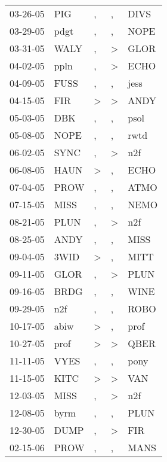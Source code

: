\begin{supertabular}{lllll}
 03-26-05 &   PIG &             , &             , &  DIVS \\
 03-29-05 &  pdgt &             , &             , &  NOPE \\
 03-31-05 &  WALY &             , &  \textgreater &  GLOR \\
 04-02-05 &  ppln &             , &  \textgreater &  ECHO \\
 04-09-05 &  FUSS &             , &             , &  jess \\
 04-15-05 &   FIR &  \textgreater &  \textgreater &  ANDY \\
 05-03-05 &   DBK &             , &             , &  psol \\
 05-08-05 &  NOPE &             , &             , &  rwtd \\
 06-02-05 &  SYNC &             , &  \textgreater &   n2f \\
 06-08-05 &  HAUN &  \textgreater &             , &  ECHO \\
 07-04-05 &  PROW &             , &             , &  ATMO \\
 07-15-05 &  MISS &             , &             , &  NEMO \\
 08-21-05 &  PLUN &             , &  \textgreater &   n2f \\
 08-25-05 &  ANDY &             , &             , &  MISS \\
 09-04-05 &  3WID &  \textgreater &             , &  MITT \\
 09-11-05 &  GLOR &             , &  \textgreater &  PLUN \\
 09-16-05 &  BRDG &             , &             , &  WINE \\
 09-29-05 &   n2f &             , &             , &  ROBO \\
 10-17-05 &  abiw &  \textgreater &             , &  prof \\
 10-27-05 &  prof &  \textgreater &  \textgreater &  QBER \\
 11-11-05 &  VYES &             , &             , &  pony \\
 11-15-05 &  KITC &  \textgreater &  \textgreater &   VAN \\
 12-03-05 &  MISS &             , &  \textgreater &   n2f \\
 12-08-05 &  byrm &             , &             , &  PLUN \\
 12-30-05 &  DUMP &             , &  \textgreater &   FIR \\
 02-15-06 &  PROW &             , &             , &  MANS \\

\end{supertabular}

